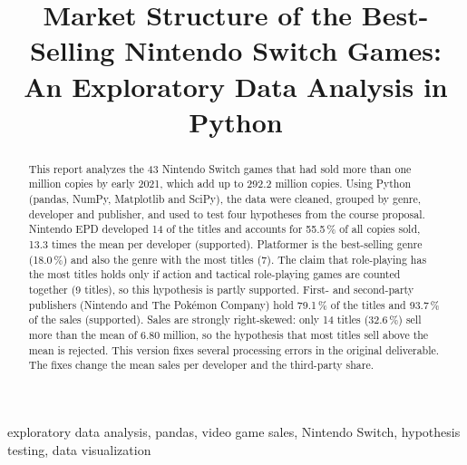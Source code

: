 \documentclass[conference]{IEEEtran}
\begin{document}
\title{Market Structure of the Best-Selling Nintendo Switch Games:\\
An Exploratory Data Analysis in Python}

\author{
}

\maketitle

\begin{abstract}
This report analyzes the 43 Nintendo Switch games that had sold more than one million copies by early 2021, which add up to 292.2 million copies. Using Python (pandas, NumPy, Matplotlib and SciPy), the data were cleaned, grouped by genre, developer and publisher, and used to test four hypotheses from the course proposal. Nintendo EPD developed 14 of the titles and accounts for 55.5\,\% of all copies sold, 13.3 times the mean per developer (supported). Platformer is the best-selling genre (18.0\,\%) and also the genre with the most titles (7). The claim that role-playing has the most titles holds only if action and tactical role-playing games are counted together (9 titles), so this hypothesis is partly supported. First- and second-party publishers (Nintendo and The Pokémon Company) hold 79.1\,\% of the titles and 93.7\,\% of the sales (supported). Sales are strongly right-skewed: only 14 titles (32.6\,\%) sell more than the mean of 6.80 million, so the hypothesis that most titles sell above the mean is rejected. This version fixes several processing errors in the original deliverable. The fixes change the mean sales per developer and the third-party share.
\end{abstract}

\begin{IEEEkeywords}
exploratory data analysis, pandas, video game sales, Nintendo Switch, hypothesis testing, data visualization
\end{IEEEkeywords}
\end{document}
